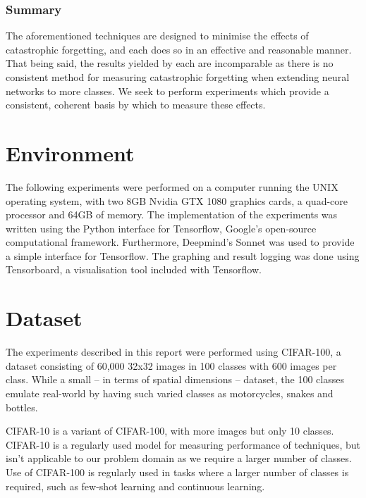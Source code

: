 \documentclass{report}
\begin{document}
	\subsubsection{Summary}
	The aforementioned techniques are designed to minimise the effects of catastrophic forgetting, and each does so in an effective and reasonable manner. That being said, the results yielded by each are incomparable as there is no consistent method for measuring catastrophic forgetting when extending neural networks to more classes. We seek to perform experiments which provide a consistent, coherent basis by which to measure these effects. \par
	

	\section{Environment}
	The following experiments were performed on a computer running the UNIX operating system, with two 8GB Nvidia GTX 1080 graphics cards, a quad-core processor and 64GB of memory. The implementation of the experiments was written using the Python interface for Tensorflow\parencite{tensorflow}, Google's open-source computational framework. Furthermore, Deepmind's Sonnet\parencite{sonnet} was used to provide a simple interface for Tensorflow. The graphing and result logging was done using Tensorboard, a visualisation tool included with Tensorflow. \par
	
	\section{Dataset}
	The experiments described in this report were performed using CIFAR-100\parencite{cifar100}, a dataset consisting of 60,000 32x32 images in 100 classes with 600 images per class. While a small -- in terms of spatial dimensions -- dataset, the 100 classes emulate real-world by having such varied classes as motorcycles, snakes and bottles. \par
	CIFAR-10 is a variant of CIFAR-100, with more images but only 10 classes. CIFAR-10 is a regularly used model for measuring performance of techniques, but isn't applicable to our problem domain as we require a larger number of classes. Use of CIFAR-100 is regularly used in tasks where a larger number of classes is required, such as few-shot learning and continuous learning. \par
	
\end{document}
